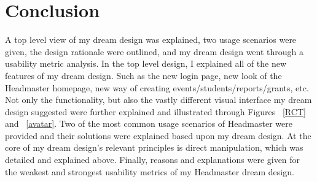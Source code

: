 \documentclass[11pt]{article}
\begin{document}
\section{Conclusion}
A top level view of my dream design was explained, two usage scenarios were given, the design rationale were outlined, and my dream design went through a usability metric analysis. In the top level design, I explained all of the new features of my dream design. Such as the new login page, new look of the Headmaster homepage, new way of creating events/students/reports/grants, etc. Not only the functionality, but also the vastly different visual interface my dream design suggested were further explained and illustrated through Figures ~\ref{RCT} and ~\ref{avatar}. Two of the most common usage scenarios of Headmaster were provided and their solutions were explained based upon my dream design. At the core of my dream design's relevant principles is direct manipulation, which was detailed and explained above. Finally, reasons and explanations were given for the weakest and strongest usability metrics of my Headmaster dream design. 
\end{document}
